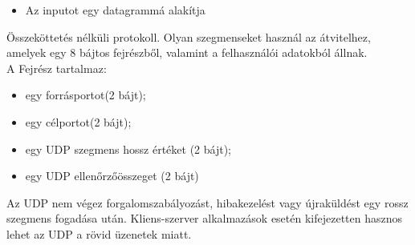 \documentclass[margin=0px]{article}
\begin{document}
\begin{description}
\begin{itemize}
\begin{itemize}
                      \item Az inputot egy datagrammá alakítja
                  \end{itemize}
                  Összeköttetés nélküli protokoll. Olyan szegmenseket használ az átvitelhez, amelyek egy 8 bájtos fejrészből, valamint a felhasználói adatokból állnak.\\
                  A Fejrész tartalmaz:
                  \begin{itemize}
                      \item egy forrásportot(2 bájt);
                      \item egy célportot(2 bájt);
                      \item egy UDP szegmens hossz értéket (2 bájt);
                      \item egy UDP ellenőrzőösszeget (2 bájt)
                  \end{itemize}
                  Az UDP nem végez forgalomszabályozást, hibakezelést vagy újraküldést egy rossz szegmens fogadása után. Kliens-szerver alkalmazások esetén kifejezetten hasznos lehet az UDP a rövid üzenetek miatt.
        \end{itemize}
\end{description}
\end{document}

